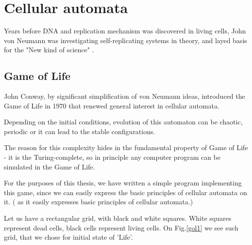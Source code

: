 \chapter{Cellular automata}


Years before DNA and replication mechanism was discovered in living cells,
John von Neumann was investigating self-replicating systems in theory, 
and layed basis for the "New kind of science" \cite{wolfram}. 



\section{Game of Life}

John Conway, by significant simplification of von Neumann ideas, introduced the Game of Life in 1970 that renewed general interest in cellular automata.

Depending on the initial conditions, evolution of this automaton can be chaotic, periodic or it can lead to the stable configurations.

The reason for this complexity hides in the fundamental property of Game of Life - it is the Turing-complete, so in principle any computer program can be simulated in the Game of Life.

For the purposes of this thesis, we have written a simple program implementing this game, since we can easily express the basic principles of cellular automata on it. ( as it easily expresses basic principles of cellular automata.)

Let us have a rectangular grid, with black and white squares. 
White squares represent dead cells, black cells represent living cells.
On Fig.\ref{gol1} we see such grid, that we chose for initial state of 'Life'.


